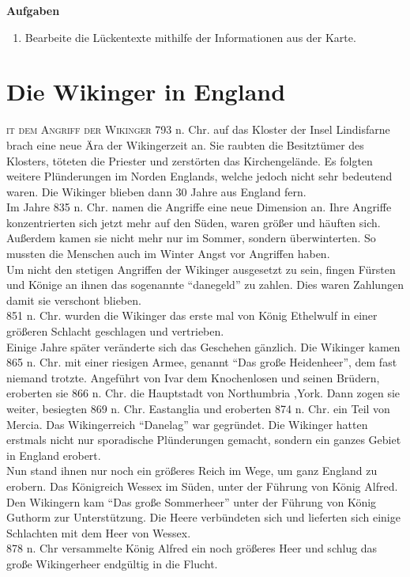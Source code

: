 \documentclass[12pt,a4paper,ngerman,openany]{book}
\newcommand{\flettrine}[2]{\lettrine[lines=2, depth=0, loversize=0.25, nindent=0.69pt, lraise=0.15]{\initfamily{#1}}{#2}}
\newcommand*\initfamily{\usefont{U}{GotIn}{xl}{n}}
\newcommand{\aufgaben}[1]{
  \begin{tcolorbox}
    \textbf{Aufgaben}
    \begin{enumerate}
      #1
    \end{enumerate}
  \end{tcolorbox}
} %
\begin{document}
\aufgaben{
  \item Bearbeite die Lückentexte mithilfe der Informationen aus der Karte.
}

\section{Die Wikinger in England}
\flettrine{M}{it dem Angriff der Wikinger} 793 n. Chr. auf das Kloster der Insel Lindisfarne brach eine neue Ära der Wikingerzeit an. Sie raubten die Besitztümer des Klosters, töteten die Priester und zerstörten das Kirchengelände. Es folgten weitere Plünderungen im Norden Englands, welche jedoch nicht sehr bedeutend waren. Die Wikinger blieben dann 30 Jahre aus England fern. \\
Im Jahre 835 n. Chr. namen die Angriffe eine neue Dimension an. Ihre Angriffe konzentrierten sich jetzt mehr auf den Süden, waren größer und häuften sich. Außerdem kamen sie nicht mehr nur im Sommer, sondern überwinterten. So mussten die Menschen auch im Winter Angst vor Angriffen haben. \\
Um nicht den stetigen Angriffen der Wikinger ausgesetzt zu sein, fingen Fürsten und Könige an ihnen das sogenannte “danegeld” zu zahlen. Dies waren Zahlungen damit sie verschont blieben. \\
851 n. Chr. wurden die Wikinger das erste mal von König Ethelwulf in einer größeren Schlacht geschlagen und vertrieben.\\
Einige Jahre später veränderte sich das Geschehen gänzlich. Die Wikinger kamen 865 n. Chr. mit einer riesigen Armee, genannt “Das große Heidenheer”, dem fast niemand trotzte. Angeführt von Ivar dem Knochenlosen und seinen Brüdern, eroberten sie 866 n. Chr. die Hauptstadt von Northumbria ,York. Dann zogen sie weiter, besiegten 869 n. Chr. Eastanglia und eroberten 874 n. Chr. ein Teil von Mercia. Das Wikingerreich “Danelag” war gegründet. Die Wikinger hatten erstmals nicht nur sporadische Plünderungen gemacht, sondern ein ganzes Gebiet in England erobert. \\
Nun stand ihnen nur noch ein größeres Reich im Wege, um ganz England zu erobern. Das Königreich Wessex im Süden, unter der Führung von König Alfred. Den Wikingern kam “Das große Sommerheer” unter der Führung von König Guthorm zur Unterstützung. Die Heere verbündeten sich und lieferten sich einige Schlachten mit dem Heer von Wessex. \\
878 n. Chr versammelte König Alfred ein noch größeres Heer und schlug das große Wikingerheer endgültig in die Flucht.
\end{document}
